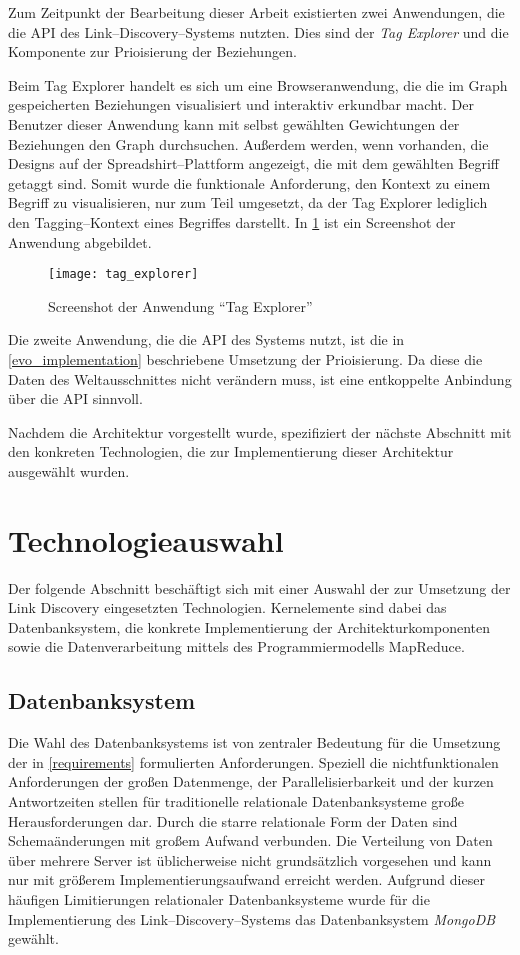 Zum Zeitpunkt der Bearbeitung dieser Arbeit existierten zwei Anwendungen, die die API des Link--Discovery--Systems nutzten. Dies sind der \emph{Tag Explorer} und die Komponente zur Prioisierung der Beziehungen.

Beim Tag Explorer handelt es sich um eine Browseranwendung, die die im Graph gespeicherten Beziehungen visualisiert und interaktiv erkundbar macht. Der Benutzer dieser Anwendung kann mit selbst gewählten Gewichtungen der Beziehungen den Graph durchsuchen. Außerdem werden, wenn vorhanden, die Designs auf der Spreadshirt--Plattform angezeigt, die mit dem gewählten Begriff getaggt sind. Somit wurde die funktionale Anforderung, den Kontext zu einem Begriff zu visualisieren, nur zum Teil umgesetzt, da der Tag Explorer lediglich den Tagging--Kontext eines Begriffes darstellt. In \cref{fig:tag_explorer} ist ein Screenshot der Anwendung abgebildet.

\begin{figure}
\centering
\texttt{[image: tag\_explorer]}
\caption{Screenshot der Anwendung ``Tag Explorer''}
\label{fig:tag_explorer}
\end{figure}

Die zweite Anwendung, die die API des Systems nutzt, ist die in \cref{evo_implementation} beschriebene Umsetzung der Prioisierung. Da diese die Daten des Weltausschnittes nicht verändern muss, ist eine entkoppelte Anbindung über die API sinnvoll.

Nachdem die Architektur vorgestellt wurde, spezifiziert der nächste Abschnitt mit den konkreten Technologien, die zur Implementierung dieser Architektur ausgewählt wurden.

\section{Technologieauswahl}
\label{tech}

Der folgende Abschnitt beschäftigt sich mit einer Auswahl der zur Umsetzung der Link Discovery eingesetzten Technologien. Kernelemente sind dabei das Datenbanksystem, die konkrete Implementierung der Architekturkomponenten sowie die Datenverarbeitung mittels des Programmiermodells MapReduce.

\subsection{Datenbanksystem}
\label{db_choice}

Die Wahl des Datenbanksystems ist von zentraler Bedeutung für die Umsetzung der in \cref{requirements} formulierten Anforderungen. Speziell die nichtfunktionalen Anforderungen der großen Datenmenge, der Parallelisierbarkeit und der kurzen Antwortzeiten stellen für traditionelle relationale Datenbanksysteme große Herausforderungen dar. Durch die starre relationale Form der Daten sind Schemaänderungen mit großem Aufwand verbunden. Die Verteilung von Daten über mehrere Server ist üblicherweise nicht grundsätzlich vorgesehen und kann nur mit größerem Implementierungsaufwand erreicht werden. Aufgrund dieser häufigen Limitierungen relationaler Datenbanksysteme wurde für die Implementierung des Link--Discovery--Systems das Datenbanksystem \emph{MongoDB} \cite{mo2013} gewählt.

